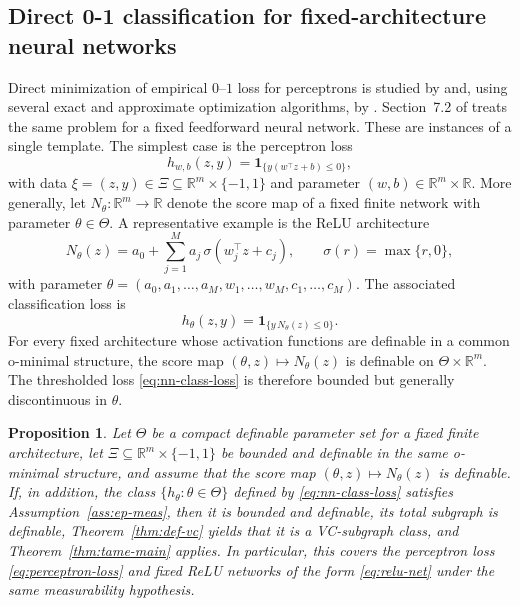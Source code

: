 \documentclass[11pt]{article}
\newtheorem{proposition}[theorem]{Proposition}\newtheorem{lemma}[theorem]{Lemma}\newtheorem{corollary}[theorem]{Corollary}\newtheorem{assumption}{Assumption}[section]\theoremstyle{definition}
\begin{document}
\subsection{Direct 0-1 classification for fixed-architecture neural networks}

Direct minimization of empirical $0$--$1$ loss for perceptrons
is studied by \citet{LiLin2007} and, using several exact and approximate
optimization algorithms, by \citet{NguyenSanner2013}. Section~7.2
of \citet{Westerhout2024} treats the same problem for a fixed
feedforward neural network. These are instances of a single template.
The simplest case is the perceptron loss 
\begin{equation}
h_{w,b}(z,y)=\mathbf{1}_{\{y(w^{\top}z+b)\le0\}},\label{eq:perceptron-loss}
\end{equation}
with data $\xi=(z,y)\in\Xi\subseteq\mathbb{R}^{m}\times\{-1,1\}$
and parameter $(w,b)\in\mathbb{R}^{m}\times\mathbb{R}$. More generally,
let $N_{\theta}:\mathbb{R}^{m}\to\mathbb{R}$ denote the score map
of a fixed finite network with parameter $\theta\in\Theta$. A representative example is the
ReLU architecture 
\begin{equation}
N_{\theta}(z)=a_{0}+\sum_{j=1}^{M}a_{j}\,\sigma(w_{j}^{\top}z+c_{j}),\qquad\sigma(r)=\max\{r,0\},\label{eq:relu-net}
\end{equation}
with parameter $\theta=(a_{0},a_{1},\dots,a_{M},w_{1},\dots,w_{M},c_{1},\dots,c_{M})$.
The associated classification loss is 
\begin{equation}
h_{\theta}(z,y)=\mathbf{1}_{\{y\,N_{\theta}(z)\le0\}}.\label{eq:nn-class-loss}
\end{equation}
For every fixed architecture whose activation functions are definable
in a common o-minimal structure, the score map $(\theta,z)\mapsto N_{\theta}(z)$
is definable on $\Theta\times\mathbb{R}^{m}$. The thresholded loss
\eqref{eq:nn-class-loss} is therefore bounded but generally discontinuous
in $\theta$.

\begin{proposition}\label{prop:classification} Let $\Theta$ be
a compact definable parameter set for a fixed finite architecture,
let $\Xi\subseteq\mathbb{R}^{m}\times\{-1,1\}$ be bounded and definable
in the same o-minimal structure, and assume that the score map $(\theta,z)\mapsto N_{\theta}(z)$
is definable. If, in addition, the class $\{h_{\theta}:\theta\in\Theta\}$
defined by \eqref{eq:nn-class-loss} satisfies Assumption~\ref{ass:ep-meas}, then it
is bounded and definable, its total subgraph is definable, Theorem~\ref{thm:def-vc}
yields that it is a VC-subgraph class, and Theorem~\ref{thm:tame-main}
applies. In particular, this covers the perceptron loss
\eqref{eq:perceptron-loss} and fixed ReLU networks of the form \eqref{eq:relu-net}
under the same measurability hypothesis. \end{proposition}
\end{document}
